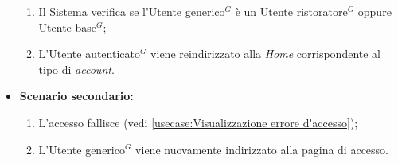 \begin{itemize}
\begin{enumerate}
		      \item Il Sistema verifica se l'\gls{Utente generico}$^G$ è un \gls{Utente ristoratore}$^G$ oppure \gls{Utente base}$^G$;
		      \item L'\gls{Utente autenticato}$^G$ viene reindirizzato alla \textit{Home} corrispondente al tipo di \textit{account}.
	      \end{enumerate}
		
	\item \textbf{Scenario secondario:}
		\begin{enumerate}
			\item L'accesso fallisce (vedi \autoref{usecase:Visualizzazione errore d'accesso});
			\item L'\gls{Utente generico}$^G$ viene nuovamente indirizzato alla pagina di accesso.
		\end{enumerate}	
	\end{itemize}
